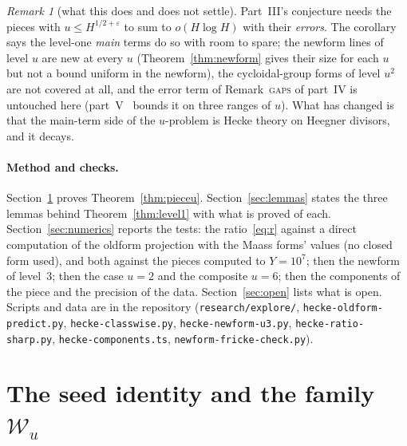 \documentclass[11pt,a4paper]{article}
\theoremstyle{remark}\newtheorem{remark}[theorem]{Remark}
\begin{document}
\begin{remark}[what this does and does not settle]
Part~III's conjecture needs the pieces with $u\le H^{1/2+\varepsilon}$ to sum to $o(H\log H)$ with their \emph{errors}. The
corollary says the level-one \emph{main} terms do so with room to spare; the newform lines of level $u$ are new at every
$u$ (Theorem~\ref{thm:newform} gives their size for each $u$ but not a bound uniform in the newform), the cycloidal-group
forms of level $u^2$~\cite{Stromberg2012} are not covered at all, and the error term of Remark~\textsc{gaps} of part~IV is
untouched here (part~V~\cite{ReichardtV} bounds it on three ranges of $u$). What has changed is that the main-term side of the $u$-problem is Hecke theory on Heegner divisors, and it
decays.
\end{remark}

{\sloppy\paragraph{Method and checks.} Section~\ref{sec:seed} proves Theorem~\ref{thm:pieceu}. Section~\ref{sec:lemmas} states
the three lemmas behind Theorem~\ref{thm:level1} with what is proved of each. Section~\ref{sec:numerics} reports the
tests: the ratio~\eqref{eq:r} against a direct computation of the oldform projection with the Maass forms' values (no
closed form used), and both against the pieces computed to $Y=10^7$; then the newform of level~$3$; then the case $u=2$
and the composite $u=6$; then the components of the piece and the precision of the data. Section~\ref{sec:open} lists what is open. Scripts and data are in the repository
(\texttt{research/explore/}, \texttt{hecke-oldform-predict.py}, \texttt{hecke-classwise.py}, \texttt{hecke-newform-u3.py}, \texttt{hecke-ratio-sharp.py}, \texttt{hecke-components.ts}, \texttt{newform-fricke-check.py}).\par}

\section{The seed identity and the family $\mathcal W_u$}\label{sec:seed}
\end{document}
